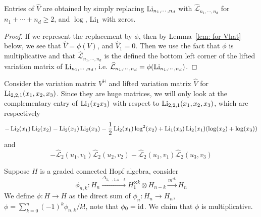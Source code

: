 \begin{theorem}\label{thm: lifted connection form is made up of one-forms}
Entries of $\widehat V$ are obtained by simply replacing $\operatorname{Li}_{n_1,\cdots,n_d}$ with $\widehat{\mathcal L}_{n_1,\cdots,n_d}$ for $n_1+\cdots+n_d\geq2$, and $\log$, $\operatorname{Li}_1$ with zeros.
\end{theorem}

\begin{proof}
If we represent the replacement by $\phi$, then by Lemma~\ref{lem: for Vhat} below, we see that $\widehat V=\phi(V)$, and $\widehat V_1=0$. Then we use the fact that $\phi$ is multiplicative and that $\widehat{\mathcal L}_{n_1,\cdots,n_d}$ is the defined the bottom left corner of the lifted variation matrix of $\operatorname{Li}_{n_1,\cdots,n_d}$, i.e. $\widehat{\mathcal L}_{n_1,\cdots,n_d}=\phi(\operatorname{Li}_{n_1,\cdots,n_d})$.
\end{proof}

\begin{example}\label{ex: make-up of VHat and OmegaHat}
Consider the variation matrix $V^{\mathbb H}$ and lifted variation matrix $\widehat V$ for $\operatorname{Li}_{2,2,1}(x_1,x_2,x_3)$. Since they are huge matrices, we will only look at the complementary entry of $\operatorname{Li}_1(x_2x_3)$ with respect to $\operatorname{Li}_{2,2,1}(x_1,x_2,x_3)$, which are respectively
\[
-\operatorname{Li}_2(x_1) \operatorname{Li}_2(x_2)-\operatorname{Li}_2(x_1) \operatorname{Li}_2(x_3)-\frac{1}{2}\operatorname{Li}_2(x_1)\log^2(x_2)+\operatorname{Li}_1(x_3)\operatorname{Li}_2(x_1)(\log (x_2)+\log(x_3))
\]
and
\[
-\widehat{\mathcal L}_2(u_1,v_1) \widehat{\mathcal L}_2(u_2,v_2)-\widehat{\mathcal L}_2(u_1,v_1) \widehat{\mathcal L}_2(u_3,v_3)
\]
\end{example}

\begin{lemma}\label{lem: for Vhat}
Suppose $H$ is a graded connected Hopf algebra, consider
\[
\phi_{n,k}:H_n\xrightarrow{\Delta_{1,\cdots,1,n-k}}H_1^{\otimes k}\otimes H_{n-k}\xrightarrow{m^{\circ k}}H_n
\]
We define $\phi:H\to H$ as the direct sum of $\phi_n:H_n\to H_n$, $\phi=\sum_{k=0}^n(-1)^k\phi_{n,k}/k!$, note that $\phi_0=\operatorname{id}$. We claim that $\phi$ is multiplicative.
\end{lemma}

